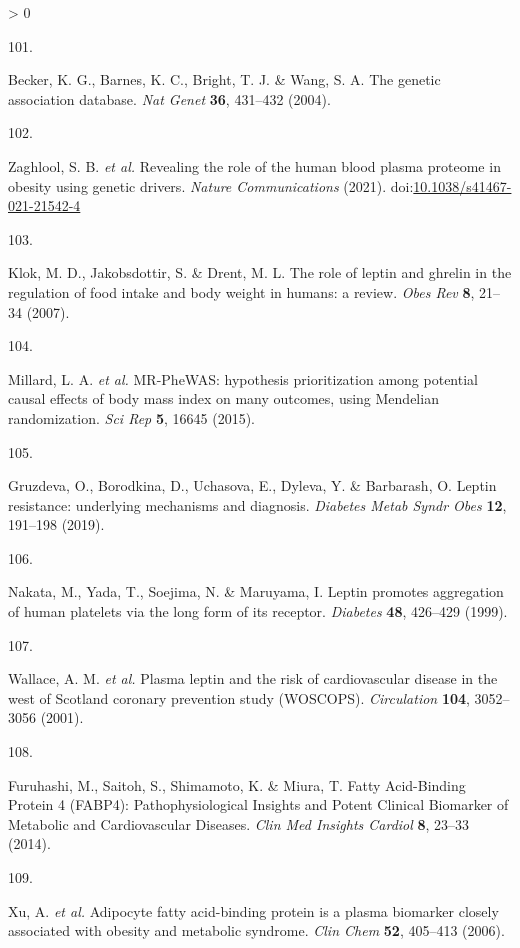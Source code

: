 \documentclass[11pt,twoside]{bristolthesis}
\newlength{\cslhangindent}
\newlength{\csllabelwidth}
\newenvironment{CSLReferences}[2] %
 {%
  \setlength{\parindent}{0pt}
  \ifodd #1 \everypar{\setlength{\hangindent}{\cslhangindent}}\ignorespaces\fi
  \ifnum #2 > 0
  \setlength{\parskip}{#2\baselineskip}
  \fi
 }%
 {}
\newcommand{\CSLLeftMargin}[1]{\parbox[t]{\csllabelwidth}{#1}}
\newcommand{\CSLRightInline}[1]{\parbox[t]{\linewidth - \csllabelwidth}{#1}\break}
\begin{document}
\begin{CSLReferences}{0}{0}
\leavevmode\hypertarget{ref-Becker2004a}{}%
\CSLLeftMargin{101. }
\CSLRightInline{Becker, K. G., Barnes, K. C., Bright, T. J. \& Wang, S. A. {The genetic association database}. \emph{Nat Genet} \textbf{36}, 431--432 (2004).}

\leavevmode\hypertarget{ref-Zaghlool2021}{}%
\CSLLeftMargin{102. }
\CSLRightInline{Zaghlool, S. B. \emph{et al.} {Revealing the role of the human blood plasma proteome in obesity using genetic drivers}. \emph{Nature Communications} (2021). doi:\href{https://doi.org/10.1038/s41467-021-21542-4}{10.1038/s41467-021-21542-4}}

\leavevmode\hypertarget{ref-Klok2007}{}%
\CSLLeftMargin{103. }
\CSLRightInline{Klok, M. D., Jakobsdottir, S. \& Drent, M. L. {The role of leptin and ghrelin in the regulation of food intake and body weight in humans: a review}. \emph{Obes Rev} \textbf{8}, 21--34 (2007).}

\leavevmode\hypertarget{ref-Millard2015}{}%
\CSLLeftMargin{104. }
\CSLRightInline{Millard, L. A. \emph{et al.} {MR-PheWAS: hypothesis prioritization among potential causal effects of body mass index on many outcomes, using Mendelian randomization}. \emph{Sci Rep} \textbf{5}, 16645 (2015).}

\leavevmode\hypertarget{ref-Gruzdeva2019a}{}%
\CSLLeftMargin{105. }
\CSLRightInline{Gruzdeva, O., Borodkina, D., Uchasova, E., Dyleva, Y. \& Barbarash, O. {Leptin resistance: underlying mechanisms and diagnosis}. \emph{Diabetes Metab Syndr Obes} \textbf{12}, 191--198 (2019).}

\leavevmode\hypertarget{ref-Nakata1999}{}%
\CSLLeftMargin{106. }
\CSLRightInline{Nakata, M., Yada, T., Soejima, N. \& Maruyama, I. {Leptin promotes aggregation of human platelets via the long form of its receptor}. \emph{Diabetes} \textbf{48}, 426--429 (1999).}

\leavevmode\hypertarget{ref-Wallace2001}{}%
\CSLLeftMargin{107. }
\CSLRightInline{Wallace, A. M. \emph{et al.} {Plasma leptin and the risk of cardiovascular disease in the west of Scotland coronary prevention study (WOSCOPS)}. \emph{Circulation} \textbf{104}, 3052--3056 (2001).}

\leavevmode\hypertarget{ref-Furuhashi2014}{}%
\CSLLeftMargin{108. }
\CSLRightInline{Furuhashi, M., Saitoh, S., Shimamoto, K. \& Miura, T. {Fatty Acid-Binding Protein 4 (FABP4): Pathophysiological Insights and Potent Clinical Biomarker of Metabolic and Cardiovascular Diseases}. \emph{Clin Med Insights Cardiol} \textbf{8}, 23--33 (2014).}

\leavevmode\hypertarget{ref-Xu2006}{}%
\CSLLeftMargin{109. }
\CSLRightInline{Xu, A. \emph{et al.} {Adipocyte fatty acid-binding protein is a plasma biomarker closely associated with obesity and metabolic syndrome}. \emph{Clin Chem} \textbf{52}, 405--413 (2006).}


\end{CSLReferences}
\end{document}
